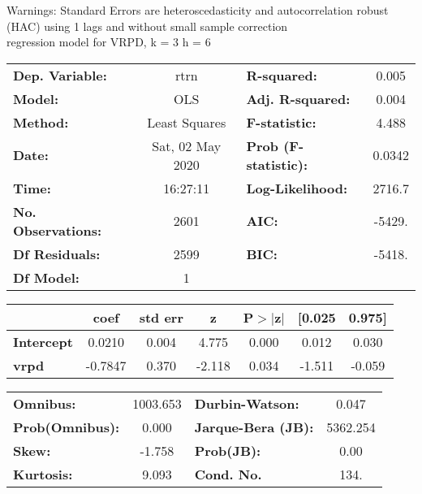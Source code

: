 Warnings: \newline
 [1] Standard Errors are heteroscedasticity and autocorrelation robust (HAC) using 1 lags and without small sample correction\\ 

regression model for VRPD, k = 3 h = 6\begin{center}
\begin{tabular}{lclc}
\toprule
\textbf{Dep. Variable:}    &       rtrn       & \textbf{  R-squared:         } &     0.005   \\
\textbf{Model:}            &       OLS        & \textbf{  Adj. R-squared:    } &     0.004   \\
\textbf{Method:}           &  Least Squares   & \textbf{  F-statistic:       } &     4.488   \\
\textbf{Date:}             & Sat, 02 May 2020 & \textbf{  Prob (F-statistic):} &   0.0342    \\
\textbf{Time:}             &     16:27:11     & \textbf{  Log-Likelihood:    } &    2716.7   \\
\textbf{No. Observations:} &        2601      & \textbf{  AIC:               } &    -5429.   \\
\textbf{Df Residuals:}     &        2599      & \textbf{  BIC:               } &    -5418.   \\
\textbf{Df Model:}         &           1      & \textbf{                     } &             \\
\bottomrule
\end{tabular}
\begin{tabular}{lcccccc}
                   & \textbf{coef} & \textbf{std err} & \textbf{z} & \textbf{P$> |$z$|$} & \textbf{[0.025} & \textbf{0.975]}  \\
\midrule
\textbf{Intercept} &       0.0210  &        0.004     &     4.775  &         0.000        &        0.012    &        0.030     \\
\textbf{vrpd}      &      -0.7847  &        0.370     &    -2.118  &         0.034        &       -1.511    &       -0.059     \\
\bottomrule
\end{tabular}
\begin{tabular}{lclc}
\textbf{Omnibus:}       & 1003.653 & \textbf{  Durbin-Watson:     } &    0.047  \\
\textbf{Prob(Omnibus):} &   0.000  & \textbf{  Jarque-Bera (JB):  } & 5362.254  \\
\textbf{Skew:}          &  -1.758  & \textbf{  Prob(JB):          } &     0.00  \\
\textbf{Kurtosis:}      &   9.093  & \textbf{  Cond. No.          } &     134.  \\
\bottomrule
\end{tabular}
\end{center}

